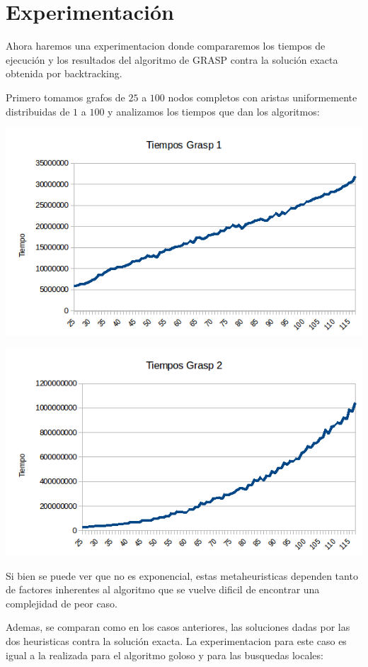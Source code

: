 \section{Experimentación}

Ahora haremos una experimentacion donde compararemos los tiempos de ejecución y los resultados del algoritmo de GRASP contra la solución exacta obtenida por backtracking.

Primero tomamos grafos de $25$ a $100$ nodos completos con aristas uniformemente distribuidas de $1$ a $100$ y analizamos los tiempos que dan los algoritmos:

\includegraphics[scale=0.5]{Ej5/tiempog1.png}

\includegraphics[scale=0.5]{Ej5/tiempog2.png}

Si bien se puede ver que no es exponencial, estas metaheuristicas dependen tanto de factores inherentes al algoritmo que se vuelve dificil de encontrar una complejidad de peor caso.

Ademas, se comparan como en los casos anteriores, las soluciones dadas por las dos heuristicas contra la solución exacta. La experimentacion para este caso es igual a la realizada para el algoritmo goloso y para las busquedas locales:


